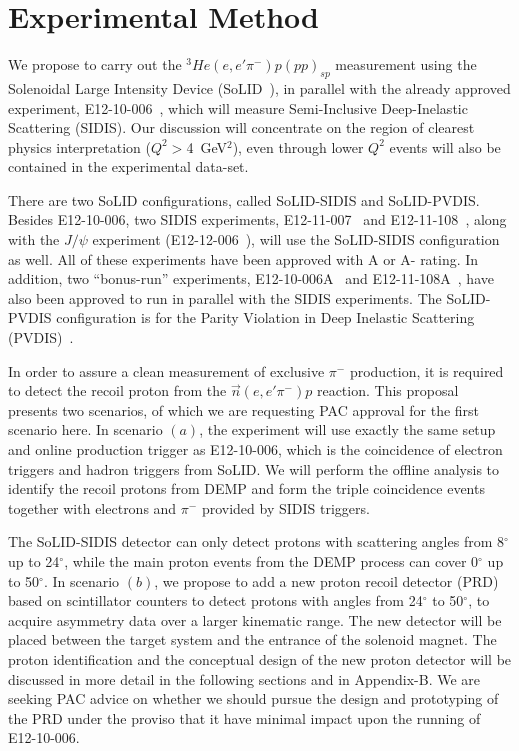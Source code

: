 \section{Experimental Method}

We propose to carry out the $^3He(e,e'\pi^-)p(pp)_{sp}$ measurement using the
Solenoidal Large Intensity Device (SoLID~\cite{solid_pcdr}), in parallel with
the already approved experiment, E12-10-006~\cite{solid:e12-10-006}, which will
measure Semi-Inclusive Deep-Inelastic Scattering (SIDIS). 
Our discussion will concentrate on the region of clearest physics
interpretation ($Q^2>$4~GeV$^2$), even through lower $Q^2$ events will also be
contained in the experimental data-set.

There are two SoLID
configurations, called SoLID-SIDIS and SoLID-PVDIS. Besides E12-10-006, two
SIDIS experiments, E12-11-007~\cite{solid:e12-11-007} and
E12-11-108~\cite{solid:e12-11-108}, along with the $J/\psi$ experiment
(E12-12-006~\cite{solid:e12-12-006}), will use the SoLID-SIDIS
configuration as well. All of these experiments have been approved with A or A-
rating. In addition, two ``bonus-run'' experiments,
E12-10-006A~\cite{solid:e12-10-006A} and E12-11-108A~\cite{solid:e12-11-008A},
have also been approved to run in parallel with the SIDIS experiments. The
SoLID-PVDIS configuration is for the Parity Violation in Deep Inelastic
Scattering (PVDIS)~\cite{solid:e12-10-007}.

In order to assure a clean measurement of exclusive $\pi^-$ production, it is
required to detect the recoil proton from the $\vec{n}(e,e'\pi^-)p$ reaction.
This proposal presents two scenarios, of which we are requesting PAC approval
for the first scenario here.  In scenario $(a)$, the experiment will use
exactly the same setup and online production trigger as E12-10-006, which is
the coincidence of electron triggers and hadron triggers from SoLID. We will
perform the offline analysis to identify the recoil protons from DEMP and form
the triple coincidence events together with electrons and $\pi^{-}$ provided by
SIDIS triggers.

The SoLID-SIDIS detector can only detect protons with scattering angles from
8$^{\circ}$ up to 24$^{\circ}$, while the main proton events from the DEMP
process can cover 0$^{\circ}$ up to 50$^{\circ}$. In scenario $(b)$, we
propose to add a new proton recoil detector (PRD) based on scintillator
counters to detect protons with angles from 24$^{\circ}$ to 50$^{\circ}$, to
acquire asymmetry data over a larger kinematic range. The new detector will be
placed between the target system and the entrance of the solenoid magnet. The
proton identification and the conceptual design of the new proton detector will
be discussed in more detail in the following sections and in Appendix-B.  We
are seeking PAC advice on whether we should pursue the design and prototyping
of the PRD under the proviso that it have minimal impact upon the running of
E12-10-006.


